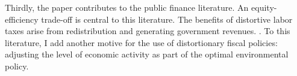 %


Thirdly, the paper contributes to the public finance literature.
An equity-efficiency trade-off is central to this literature.  The benefits of distortive labor taxes arise from redistribution and generating government revenues. 
\citep{Heathcote2017OptimalFramework, Conesa2009TaxingAll, Domeij2004OnTaxes}.
To this literature, I add another motive for the use of distortionary fiscal policies: adjusting the level of economic activity as part of the optimal environmental policy. 

